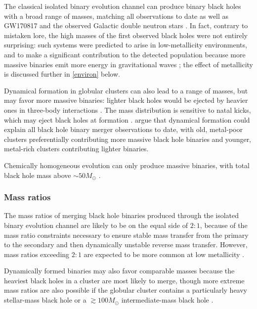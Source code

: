 \documentclass[iop,onecolumn]{revtex4-1}
\begin{document}
The classical isolated binary evolution channel can produce binary black holes with a broad range of masses, matching all observations to date \citep[e.g.,][]{Stevenson:2017,Eldridge:2017,GiacobboMapelli:2018} as well as GW170817 and the observed Galactic double neutron stars \citep[e.g.,][]{Kruckow:2018,VignaGomez:2018}.  In fact, contrary to mistaken lore, the high masses of the first observed black holes were not entirely surprising: such systems were predicted to arise in low-metallicity environments, and to make a significant contribution to the detected population because more massive binaries emit more energy in gravitational waves \citep{Dominik:2014}; the effect of metallicity is discussed further in \autoref{environ} below. 

Dynamical formation in globular clusters can also lead to a range of masses, but may favor more massive binaries: lighter black holes would be ejected by heavier ones in three-body interactions \citep{Rodriguez:2015}. The mass distribution is sensitive to natal kicks, which may eject black holes at formation \citep{Zevin:2017}.  \citet{Chatterjee:2017} argue that dynamical formation could explain all black hole binary merger observations to date, with old, metal-poor clusters preferentially contributing more massive black hole binaries and younger, metal-rich clusters contributing lighter binaries.
 
Chemically homogeneous evolution can only produce massive binaries, with total black hole mass above $\sim 50 M_\odot$ \citep{MandeldeMink:2016,Marchant:2016}.

\subsubsection{Mass ratios}
The mass ratios of merging black hole binaries produced through the isolated binary evolution channel are likely to be on the equal side of $2:1$, because of the mass ratio constraints necessary to ensure stable mass transfer from the primary to the secondary and then dynamically unstable reverse mass transfer. However, mass ratios exceeding $2:1$ are expected to be more common at low metallicity \citep{Dominik:2012,Stevenson:2017}.

Dynamically formed binaries may also favor comparable masses because the heaviest black holes in a cluster are most likely to merge, though more extreme mass ratios are also possible if the globular cluster contains a particularly heavy stellar-mass black hole or a $\gtrsim 100 M_\odot$ intermediate-mass black hole \citep{Mandel:2008,Belczynski:2014VMS}. 
\end{document}
